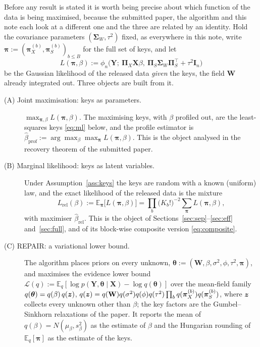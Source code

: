 \documentclass[11pt]{article}
\theoremstyle{definition}
\newcommand{\bX}{\mathbf{X}}
\newcommand{\bY}{\mathbf{Y}}
\newcommand{\bW}{\mathbf{W}}
\newcommand{\bI}{\mathbf{I}}
\newcommand{\bSig}{\boldsymbol{\Sigma}}
\newcommand{\bpi}{\boldsymbol{\pi}}
\newcommand{\bPi}{\boldsymbol{\Pi}}
\newcommand{\btheta}{\boldsymbol{\theta}}
\newcommand{\E}{\mathbb{E}}
\newcommand{\rel}{\mathrm{rel}}
\begin{document}
Before any result is stated it is worth being precise about which function of the data is being maximised, because the submitted paper, the algorithm and this note each look at a different one and the three are related by an identity. Hold the covariance parameters $(\bSig_W,\tau^2)$ fixed, as everywhere in this note, write $\bpi:=(\bpi_X^{(b)},\bpi_S^{(b)})_{b\le B}$ for the full set of keys, and let
\begin{equation}\label{eq:condlik}
L(\bpi,\beta):=\phi_n\big(\bY;\ \bPi_X\bX\beta,\ \bPi_S\bSig_W\bPi_S^\top+\tau^2\bI_n\big)
\end{equation}
be the Gaussian likelihood of the released data \emph{given} the keys, the field $\bW$ already integrated out. Three objects are built from it.
\begin{description}
\item[(A) Joint maximisation: keys as parameters.] $\max_{\bpi,\beta}L(\bpi,\beta)$. The maximising keys, with $\beta$ profiled out, are the least-squares keys \eqref{eq:ml} below, and the profile estimator is $\hat\beta_{\mathrm{prof}}:=\arg\max_\beta\max_{\bpi}L(\bpi,\beta)$. This is the object analysed in the recovery theorem of the submitted paper.
\item[(B) Marginal likelihood: keys as latent variables.] Under Assumption~\ref{ass:keys} the keys are random with a known (uniform) law, and the exact likelihood of the released data is the mixture
\begin{equation}\label{eq:marglik}
L_\rel(\beta):=\E_{\bpi}\big[L(\bpi,\beta)\big]=\prod_b\big(K_b!\big)^{-2}\sum_{\bpi}L(\bpi,\beta),
\end{equation}
with maximiser $\hat\beta_\rel$. This is the object of Sections~\ref{sec:sep}--\ref{sec:eff} and~\ref{sec:full}, and of its block-wise composite version \eqref{eq:composite}.
\item[(C) REPAIR: a variational lower bound.] The algorithm places priors on every unknown, $\btheta:=(\bW,\beta,\sigma^2,\phi,\tau^2,\bpi)$, and maximises the evidence lower bound $\mathscr L(q):=\E_q[\log p(\bY,\btheta\mid\bX)-\log q(\btheta)]$ over the mean-field family $q(\btheta)=q(\beta)\,q(\bz)$, $q(\bz)=q(\bW)q(\sigma^2)q(\phi)q(\tau^2)\prod_bq(\bpi_X^{(b)})q(\bpi_S^{(b)})$, where $\bm{z}$ collects every unknown other than $\beta$; the key factors are the Gumbel--Sinkhorn relaxations of the paper. It reports the mean of $q(\beta)=N(\mu_\beta,s_\beta^2)$ as the estimate of $\beta$ and the Hungarian rounding of $\E_q[\bpi]$ as the estimate of the keys.
\end{description}
\end{document}
